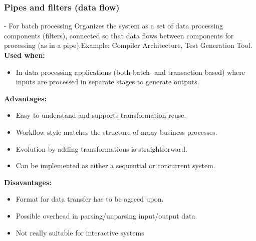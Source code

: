 \documentclass[../ESOF_notes.tex]{subfiles}
\begin{document}
\subsubsection{Pipes and filters (data flow)} - For batch processing\newline\newline
Organizes the system as a set of data processing components (filters), connected so that data flows between components for processing (as in a pipe).\newline Example: Compiler Architecture, Test Generation Tool.\newline\newline
\textbf{Used when:}
\begin{itemize}
    \item In data processing applications (both batch- and transaction based) where inputs are processed in separate stages to generate outputs.
\end{itemize}
\textbf{Advantages:}
\begin{itemize}
    \item Easy to understand and supports transformation reuse.
    \item Workflow style matches the structure of many business processes.
    \item Evolution by adding transformations is straightforward.
    \item Can be implemented as either a sequential or concurrent system.
\end{itemize}
\textbf{Disavantages:}
\begin{itemize}
    \item Format for data transfer has to be agreed upon.
    \item Possible overhead in parsing/unparsing input/output data.
    \item Not really suitable for interactive systems
\end{itemize}
\end{document}
